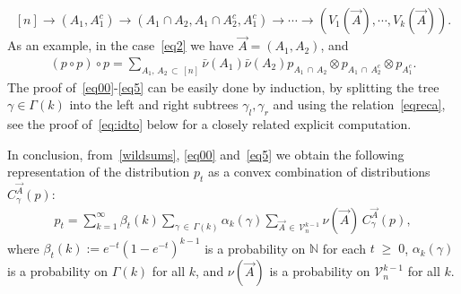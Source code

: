 \documentclass[10pt,a4paper]{article}
\renewcommand{\geq}{\;\geqslant\;}
\newcommand{\cV}{\mathcal{V}}
\newcommand{\bbN}{\mathbb{N}}
\let\b=\beta
\let\g=\gamma
\let\G=\Gamma
\begin{document}
\[
[n]\to (A_1,A_1^c) \to (A_1\cap A_2,A_1\cap A_2^c,A_1^c)\to\cdots\to \left(V_1(\vec A),\cdots,V_k(\vec A)\right).
\]
As an example, in the case~\eqref{eq2} we have $\vec A=(A_1,A_2)$, and
\begin{align}
(p \circ p)\circ p = \sum_{A_1,\,A_2 \,\subset\,[n]}\bar\nu(A_1)\bar\nu(A_2)p_{A_1\,\cap\,A_2}\otimes p_{A_1\,\cap\,A_2^c} \otimes p_{A_1^c}.
\end{align}
The proof of~\eqref{eq00}-\eqref{eq5} can be easily done by induction, by splitting the tree $\g\in\G(k)$ into the left and right subtrees $\g_l,\g_r$ and using the relation~\eqref{eqreca}, see the proof of~\eqref{eq:idto} below for a closely related explicit computation.

In conclusion, from~\eqref{wildsums}, \eqref{eq00} and~\eqref{eq5} we obtain the following representation of the distribution $p_t$ as a convex combination of distributions $C^{\vec A}_{\gamma}(p)$:
\begin{align}\label{eq0}
p_t=\sum_{k=1}^{\infty}\b_t(k)\sum_{\g\,\in \,\Gamma(k)}\alpha_k(\g)\sum_{\vec A\,\in\, \cV_n^{k-1}}\nu(\vec A) \,C^{\vec A}_{\gamma}(p),
\end{align}
where $\b_t(k) := e^{-t}(1-e^{-t})^{k-1}$ is a probability on $\bbN$ for each $t\geq 0$, $ \alpha_k(\g)$ is a probability on $\G(k)$ for all $k$, and $\nu(\vec A)$ is a probability on $\cV_n^{k-1}$ for all $k$.
\end{document}
